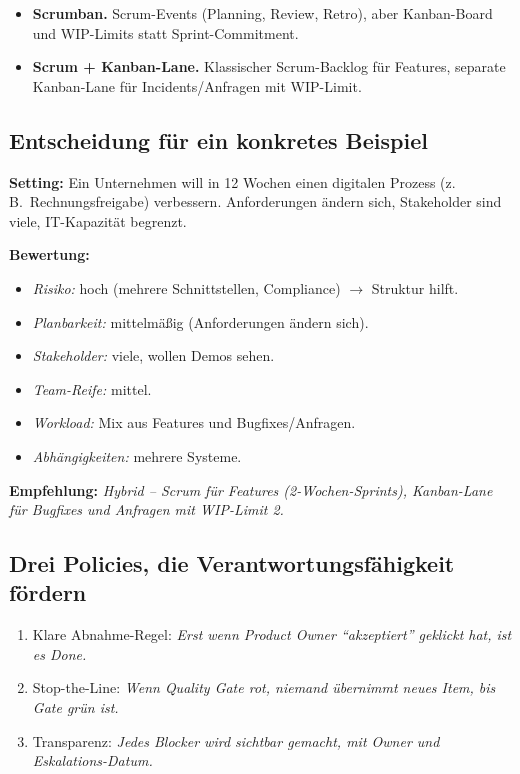 \documentclass[11pt,a4paper,oneside]{article}
\newcommand{\fachbegriff}[1]{\textbf{#1}}
\begin{document}
\begin{itemize}
  \item \fachbegriff{Scrumban.} Scrum-Events (Planning, Review, Retro), aber Kanban-Board und WIP-Limits statt Sprint-Commitment.
  \item \fachbegriff{Scrum + Kanban-Lane.} Klassischer Scrum-Backlog für Features, separate Kanban-Lane für Incidents/Anfragen mit WIP-Limit.
\end{itemize}

\subsection{Entscheidung für ein konkretes Beispiel}

\textbf{Setting:} Ein Unternehmen will in 12 Wochen einen digitalen Prozess (z.\,B.\ Rechnungsfreigabe) verbessern. Anforderungen ändern sich, Stakeholder sind viele, IT-Kapazität begrenzt.

\textbf{Bewertung:}
\begin{itemize}
  \item \emph{Risiko:} hoch (mehrere Schnittstellen, Compliance) $\rightarrow$ Struktur hilft.
  \item \emph{Planbarkeit:} mittelmäßig (Anforderungen ändern sich).
  \item \emph{Stakeholder:} viele, wollen Demos sehen.
  \item \emph{Team-Reife:} mittel.
  \item \emph{Workload:} Mix aus Features und Bugfixes/Anfragen.
  \item \emph{Abhängigkeiten:} mehrere Systeme.
\end{itemize}

\textbf{Empfehlung:} \emph{Hybrid -- Scrum für Features (2-Wochen-Sprints), Kanban-Lane für Bugfixes und Anfragen mit WIP-Limit 2.}

\subsection{Drei Policies, die Verantwortungsfähigkeit fördern}

\begin{enumerate}
  \item Klare Abnahme-Regel: \emph{Erst wenn Product Owner ``akzeptiert'' geklickt hat, ist es Done.}
  \item Stop-the-Line: \emph{Wenn Quality Gate rot, niemand übernimmt neues Item, bis Gate grün ist.}
  \item Transparenz: \emph{Jedes Blocker wird sichtbar gemacht, mit Owner und Eskalations-Datum.}
\end{enumerate}
\end{document}
